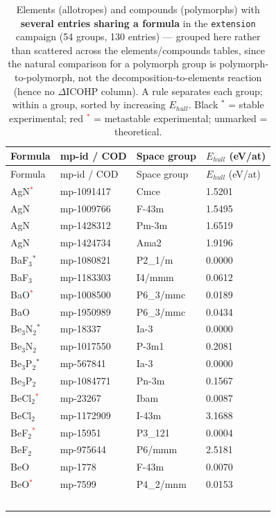 \begin{longtable}{@{}llll@{}}
\caption{Elements (allotropes) and compounds (polymorphs) with \textbf{several entries sharing a formula} in the \texttt{extension} campaign (54 groups, 130 entries) --- grouped here rather than scattered across the elements/compounds tables, since the natural comparison for a polymorph group is polymorph-to-polymorph, not the decomposition-to-elements reaction (hence no $\Delta$ICOHP column). A rule separates each group; within a group, sorted by increasing $E_{hull}$. Black $^*$ = stable experimental; red \textcolor{red}{$^*$} = metastable experimental; unmarked = theoretical.}\label{tab:ext-polymorphs}\\
\toprule
Formula & mp-id / COD & Space group & $E_{hull}$ (eV/at) \\
\midrule
\endfirsthead
\toprule
Formula & mp-id / COD & Space group & $E_{hull}$ (eV/at) \\
\midrule
\endhead
\bottomrule
\endfoot
AgN\textcolor{red}{$^*$} & mp-1091417 & Cmce & 1.5201 \\
AgN & mp-1009766 & F-43m & 1.5495 \\
AgN & mp-1428312 & Pm-3m & 1.6519 \\
AgN & mp-1424734 & Ama2 & 1.9196 \\
\midrule
BaF$_{3}$$^*$ & mp-1080821 & P2\_1/m & 0.0000 \\
BaF$_{3}$ & mp-1183303 & I4/mmm & 0.0612 \\
\midrule
BaO\textcolor{red}{$^*$} & mp-1008500 & P6\_3/mmc & 0.0189 \\
BaO & mp-1950989 & P6\_3/mmc & 0.0434 \\
\midrule
Be$_{3}$N$_{2}$$^*$ & mp-18337 & Ia-3 & 0.0000 \\
Be$_{3}$N$_{2}$ & mp-1017550 & P-3m1 & 0.2081 \\
\midrule
Be$_{3}$P$_{2}$$^*$ & mp-567841 & Ia-3 & 0.0000 \\
Be$_{3}$P$_{2}$ & mp-1084771 & Pn-3m & 0.1567 \\
\midrule
BeCl$_{2}$\textcolor{red}{$^*$} & mp-23267 & Ibam & 0.0087 \\
BeCl$_{2}$ & mp-1172909 & I-43m & 3.1688 \\
\midrule
BeF$_{2}$\textcolor{red}{$^*$} & mp-15951 & P3\_121 & 0.0004 \\
BeF$_{2}$ & mp-975644 & P6/mmm & 2.5181 \\
\midrule
BeO & mp-1778 & F-43m & 0.0070 \\
BeO\textcolor{red}{$^*$} & mp-7599 & P4\_2/mnm & 0.0153 \\
$$
\end{longtable}
